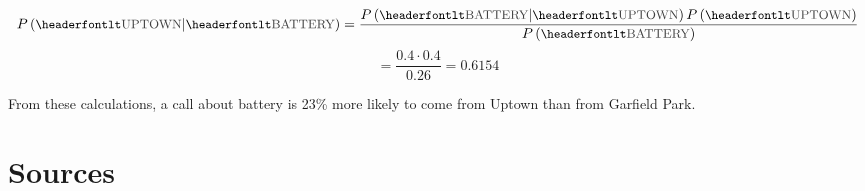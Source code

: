 \documentclass[11pt]{article}
\newcommand{\printsubsection}[1]{\normalfont\headerfontlt\textcolor{darkgray}{{#1}}}
\newcommand{\opns}[1]{\textrm{\small\printsubsection{\MakeUppercase{#1}}}}
\begin{document}
$$ P\left(\opns{UPTOWN} \middle\vert \opns{BATTERY} \right) = \frac{P\left( \opns{BATTERY} \middle\vert \opns{UPTOWN}\right) P\left( \opns{UPTOWN}\right) }{P\left(\opns{BATTERY}\right)}$$
$$ = \frac{0.4\cdot 0.4}{0.26} = 0.6154 $$

From these calculations, a call about battery is 23\% more likely to come from Uptown than from Garfield Park.
\pagebreak
\section*{Sources}
\end{document}
